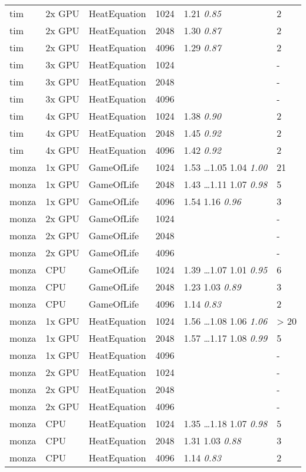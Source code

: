 \begin{tabular}{| l | l | l | l | l | l |}
tim & 2x GPU & HeatEquation & 1024 & 1.21 \textit{0.85} & 2 \\
tim & 2x GPU & HeatEquation & 2048 & 1.30 \textit{0.87} & 2 \\
tim & 2x GPU & HeatEquation & 4096 & 1.29 \textit{0.87} & 2 \\
tim & 3x GPU & HeatEquation & 1024 &  & - \\
tim & 3x GPU & HeatEquation & 2048 &  & - \\
tim & 3x GPU & HeatEquation & 4096 &  & - \\
tim & 4x GPU & HeatEquation & 1024 & 1.38 \textit{0.90} & 2 \\
tim & 4x GPU & HeatEquation & 2048 & 1.45 \textit{0.92} & 2 \\
tim & 4x GPU & HeatEquation & 4096 & 1.42 \textit{0.92} & 2 \\
monza & 1x GPU & GameOfLife & 1024 & 1.53 \ldots 1.05 1.04 \textit{1.00} & 21 \\
monza & 1x GPU & GameOfLife & 2048 & 1.43 \ldots 1.11 1.07 \textit{0.98} & 5 \\
monza & 1x GPU & GameOfLife & 4096 & 1.54 1.16 \textit{0.96} & 3 \\
monza & 2x GPU & GameOfLife & 1024 &  & - \\
monza & 2x GPU & GameOfLife & 2048 &  & - \\
monza & 2x GPU & GameOfLife & 4096 &  & - \\
monza & CPU & GameOfLife & 1024 & 1.39 \ldots 1.07 1.01 \textit{0.95} & 6 \\
monza & CPU & GameOfLife & 2048 & 1.23 1.03 \textit{0.89} & 3 \\
monza & CPU & GameOfLife & 4096 & 1.14 \textit{0.83} & 2 \\
monza & 1x GPU & HeatEquation & 1024 & 1.56 \ldots 1.08 1.06 \textit{1.06} & > 20 \\
monza & 1x GPU & HeatEquation & 2048 & 1.57 \ldots 1.17 1.08 \textit{0.99} & 5 \\
monza & 1x GPU & HeatEquation & 4096 &  & - \\
monza & 2x GPU & HeatEquation & 1024 &  & - \\
monza & 2x GPU & HeatEquation & 2048 &  & - \\
monza & 2x GPU & HeatEquation & 4096 &  & - \\
monza & CPU & HeatEquation & 1024 & 1.35 \ldots 1.18 1.07 \textit{0.98} & 5 \\
monza & CPU & HeatEquation & 2048 & 1.31 1.03 \textit{0.88} & 3 \\
monza & CPU & HeatEquation & 4096 & 1.14 \textit{0.83} & 2 \\
\hline
\end{tabular}
